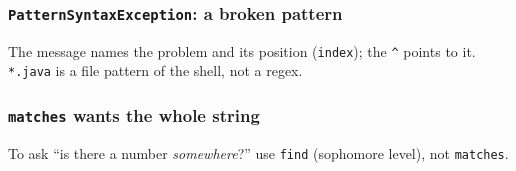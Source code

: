 \documentclass[aspectratio=169,10pt,compress]{beamer}
\begin{document}




\begin{frame}[t,fragile] \frametitle{\texttt{PatternSyntaxException}: a broken pattern}

  \vspace{0.2em}
  \small The message names the problem and its position (\texttt{index}); the \texttt{\textasciicircum} points to it. \texttt{*.java} is a file pattern of the shell, not a regex.
\end{frame}




\begin{frame}[t,fragile] \frametitle{\texttt{matches} wants the whole string}

  \vspace{0.2em}
  \small To ask ``is there a number \emph{somewhere}?'' use \texttt{find} (sophomore level), not \texttt{matches}.
\end{frame}

\end{document}
